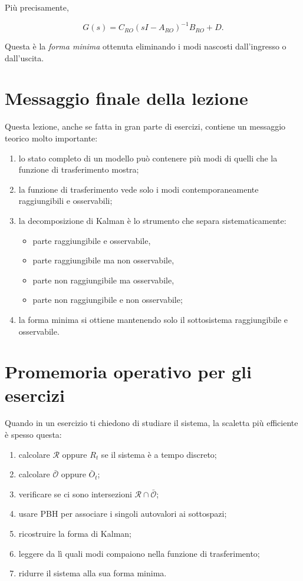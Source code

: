 Più precisamente,

\[
G(s)=C_{RO}(sI-A_{RO})^{-1}B_{RO}+D.
\]

Questa è la \emph{forma minima} ottenuta eliminando i modi nascosti dall'ingresso o dall'uscita.

\bigskip

\section{Messaggio finale della lezione}

Questa lezione, anche se fatta in gran parte di esercizi, contiene un messaggio teorico molto importante:

\begin{enumerate}
    \item lo stato completo di un modello può contenere più modi di quelli che la funzione di trasferimento mostra;
    \item la funzione di trasferimento vede solo i modi contemporaneamente raggiungibili e osservabili;
    \item la decomposizione di Kalman è lo strumento che separa sistematicamente:
    \begin{itemize}
        \item parte raggiungibile e osservabile,
        \item parte raggiungibile ma non osservabile,
        \item parte non raggiungibile ma osservabile,
        \item parte non raggiungibile e non osservabile;
    \end{itemize}
    \item la forma minima si ottiene mantenendo solo il sottosistema raggiungibile e osservabile.
\end{enumerate}

\bigskip

\section*{Promemoria operativo per gli esercizi}

Quando in un esercizio ti chiedono di studiare il sistema, la scaletta più efficiente è spesso questa:

\begin{enumerate}
    \item calcolare \(\mathcal R\) oppure \(R_t\) se il sistema è a tempo discreto;
    \item calcolare \(\bar{\mathcal O}\) oppure \(\bar O_t\);
    \item verificare se ci sono intersezioni \(\mathcal R\cap \bar{\mathcal O}\);
    \item usare PBH per associare i singoli autovalori ai sottospazi;
    \item ricostruire la forma di Kalman;
    \item leggere da lì quali modi compaiono nella funzione di trasferimento;
    \item ridurre il sistema alla sua forma minima.
\end{enumerate}